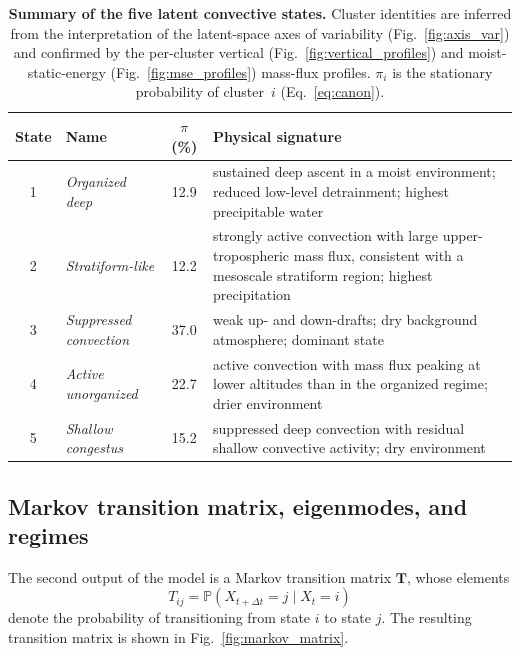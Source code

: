 \documentclass[11pt]{article}
\begin{document}
\begin{table}[t]
\centering
\small
\begin{tabular}{@{}c l c p{}@{}}
\hline
State & Name & $\pi$ (\%) & Physical signature \\
\hline
1 & \emph{Organized deep}     & 12.9 & sustained deep ascent in a moist environment; reduced low-level detrainment; highest precipitable water \\
2 & \emph{Stratiform-like}    & 12.2 & strongly active convection with large upper-tropospheric mass flux, consistent with a mesoscale stratiform region; highest precipitation \\
3 & \emph{Suppressed convection} & 37.0 & weak up- and down-drafts; dry background atmosphere; dominant state \\
4 & \emph{Active unorganized}     & 22.7 & active convection with mass flux peaking at lower altitudes than in the organized regime; drier environment \\
5 & \emph{Shallow congestus}      & 15.2 & suppressed deep convection with residual shallow convective activity; dry environment \\
\hline
\end{tabular}
\caption{\textbf{Summary of the five latent convective states.} Cluster identities are inferred from the interpretation of the latent-space axes of variability (Fig.~\ref{fig:axis_var}) and confirmed by the per-cluster vertical (Fig.~\ref{fig:vertical_profiles}) and moist-static-energy (Fig.~\ref{fig:mse_profiles}) mass-flux profiles. $\pi_i$ is the stationary probability of cluster~$i$ (Eq.~\ref{eq:canon}).}
\label{tab:state_summary}
\end{table}


\subsection{Markov transition matrix, eigenmodes, and regimes}

The second output of the model is a Markov transition matrix $\mathbf{T}$, whose elements
\begin{equation}
T_{ij} = \mathbb{P}\left( X_{t+\Delta t} = j \mid X_t = i \right)
\end{equation}
denote the probability of transitioning from state $i$ to state $j$. The resulting transition matrix is shown in Fig.~\ref{fig:markov_matrix}.
\end{document}
